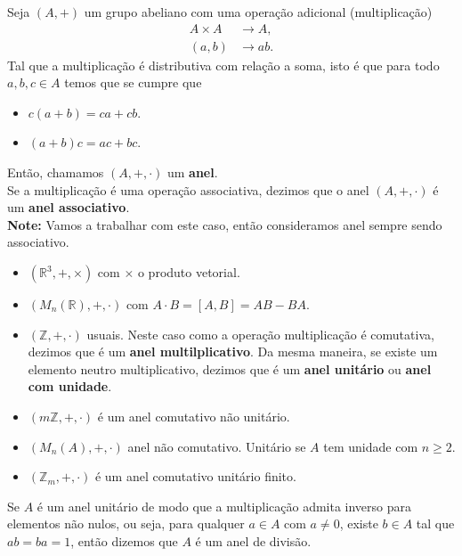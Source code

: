 \begin{definition}[Anel]
  Seja $(A,+)$ um grupo abeliano com uma operação adicional (multiplicação)
  \begin{align*}
    A\times A&\to A,\\
    (a,b)&\to ab.
  \end{align*}
  Tal que a multiplicação é distributiva com relação a soma, isto é que para todo $a,b,c\in A$ temos que se cumpre que 
  \begin{itemize}
    \item $c(a+b)=ca+cb$.
    \item $(a+b)c=ac+bc$.
  \end{itemize}
  Então, chamamos $(A,+,\cdot)$ um \textbf{anel}.\\ 
  Se a multiplicação é uma operação associativa, dezimos que o anel $(A,+,\cdot)$ é um \textbf{anel associativo}.\\
  \textbf{Note:} Vamos a trabalhar com este caso, então consideramos anel sempre sendo associativo.
\end{definition}
\begin{note}
  \begin{itemize}
    \item $(\mathbb{R}^{3},+,\times)$ com $\times$ o produto vetorial.
    \item $(M_{n}(\mathbb{R}),+,\cdot)$ com $A\cdot B=[A,B]=AB-BA$. 
  \end{itemize}
\end{note}
\begin{example}
  \begin{itemize}
    \item $(\mathbb{Z},+,\cdot)$ usuais. Neste caso como a operação multiplicação é comutativa, dezimos que é um \textbf{anel multilplicativo}. Da mesma maneira, se existe um elemento neutro multiplicativo, dezimos que é um \textbf{anel unitário} ou \textbf{anel com unidade}.
    \item $(m\mathbb{Z},+,\cdot)$ é um anel comutativo não unitário.
    \item $(M_n(A),+,\cdot)$ anel não comutativo. Unitário se $A$ tem unidade com $n\geq 2$.
    \item $(\mathbb{Z}_{m},+,\cdot)$ é um anel comutativo unitário finito. 
  \end{itemize}
\end{example}
\begin{definition}
  Se $A$ é um anel unitário de modo que a multiplicação admita inverso para elementos não nulos, ou seja, para qualquer $a\in A$ com $a\neq 0$, existe $b\in A$ tal que $ab=ba=1$, então dizemos que $A$ é um anel de divisão. 
\end{definition}

